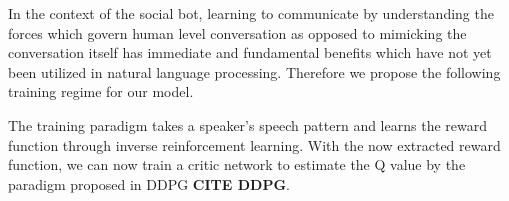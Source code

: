 \documentclass{article} %
\numberwithin{equation}{subsection}
\numberwithin{theorem}{subsection}
\theoremstyle{named}
\begin{document}
In the context of the social bot, learning to communicate by understanding the forces which govern human level conversation as opposed to mimicking the conversation itself has immediate and fundamental benefits which have not yet been utilized in natural language processing. Therefore we propose the following training regime for our model.

The training paradigm takes a speaker's speech pattern and learns the reward function through inverse reinforcement learning. With the now extracted reward function, we can now train a critic network to estimate the Q value by the paradigm proposed in DDPG \textbf{CITE DDPG}.



\printbibliography
\end{document}
